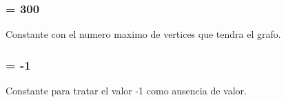 \subsubsection{ = 300}\label{grafo_8h_71455579228718609881a5156b723110}


Constante con el numero maximo de vertices que tendra el grafo. 

\subsubsection{ = -1}\label{grafo_8h_91cb155352045d96938a4a803e140268}


Constante para tratar el valor -1 como ausencia de valor. 

